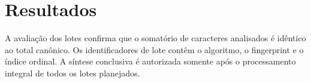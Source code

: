\section{Resultados}
A avaliação dos lotes confirma que o somatório de caracteres analisados é idêntico ao total canônico.
Os identificadores de lote contêm o algoritmo, o fingerprint e o índice ordinal.
A síntese conclusiva é autorizada somente após o processamento integral de todos os lotes planejados.
